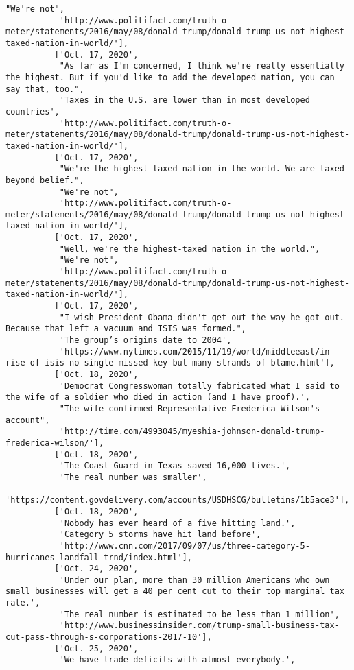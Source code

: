 \documentclass[11pt]{article}
\begin{document}
\begin{Verbatim}[commandchars=\\\{\}]
           "We're not",
           'http://www.politifact.com/truth-o-meter/statements/2016/may/08/donald-trump/donald-trump-us-not-highest-taxed-nation-in-world/'],
          ['Oct. 17, 2020',
           "As far as I'm concerned, I think we're really essentially the highest. But if you'd like to add the developed nation, you can say that, too.",
           'Taxes in the U.S. are lower than in most developed countries',
           'http://www.politifact.com/truth-o-meter/statements/2016/may/08/donald-trump/donald-trump-us-not-highest-taxed-nation-in-world/'],
          ['Oct. 17, 2020',
           "We're the highest-taxed nation in the world. We are taxed beyond belief.",
           "We're not",
           'http://www.politifact.com/truth-o-meter/statements/2016/may/08/donald-trump/donald-trump-us-not-highest-taxed-nation-in-world/'],
          ['Oct. 17, 2020',
           "Well, we're the highest-taxed nation in the world.",
           "We're not",
           'http://www.politifact.com/truth-o-meter/statements/2016/may/08/donald-trump/donald-trump-us-not-highest-taxed-nation-in-world/'],
          ['Oct. 17, 2020',
           "I wish President Obama didn't get out the way he got out. Because that left a vacuum and ISIS was formed.",
           'The group’s origins date to 2004',
           'https://www.nytimes.com/2015/11/19/world/middleeast/in-rise-of-isis-no-single-missed-key-but-many-strands-of-blame.html'],
          ['Oct. 18, 2020',
           'Democrat Congresswoman totally fabricated what I said to the wife of a soldier who died in action (and I have proof).',
           "The wife confirmed Representative Frederica Wilson's account",
           'http://time.com/4993045/myeshia-johnson-donald-trump-frederica-wilson/'],
          ['Oct. 18, 2020',
           'The Coast Guard in Texas saved 16,000 lives.',
           'The real number was smaller',
           'https://content.govdelivery.com/accounts/USDHSCG/bulletins/1b5ace3'],
          ['Oct. 18, 2020',
           'Nobody has ever heard of a five hitting land.',
           'Category 5 storms have hit land before',
           'http://www.cnn.com/2017/09/07/us/three-category-5-hurricanes-landfall-trnd/index.html'],
          ['Oct. 24, 2020',
           'Under our plan, more than 30 million Americans who own small businesses will get a 40 per cent cut to their top marginal tax rate.',
           'The real number is estimated to be less than 1 million',
           'http://www.businessinsider.com/trump-small-business-tax-cut-pass-through-s-corporations-2017-10'],
          ['Oct. 25, 2020',
           'We have trade deficits with almost everybody.',

\end{Verbatim}
\end{document}
